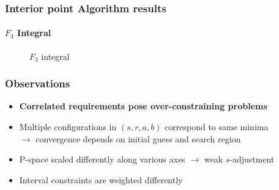 \documentclass[10pt]{beamer}
\newcommand{\rarrow}{$\rightarrow$ }
\newcommand{\rfn}{\setcounter{footnote}{0}}
\begin{document}
\begin{frame}
  \frametitle{Interior point Algorithm results}
  \rfn
  \framesubtitle{$F_3$ Integral}
  \begin{figure}
    \centering
    \label{some example}
    \caption{$F_3$ integral}
  \end{figure}
\end{frame}



\begin{frame}
  \rfn
  \frametitle{Observations}
  \begin{itemize}
    \item \textbf{Correlated requirements pose over-constraining problems}
    \vspace{0.5cm}
    \item Multiple configurations in $(s, r, a, b)$ correspond to same minima\\
      \rarrow convergence depends on initial guess and search region
    \vspace{0.5cm}
    \item P-space scaled differently along various axes \rarrow weak $s$-adjustment
    \vspace{0.5cm}
    \item Interval constraints are weighted differently
  \end{itemize}
\end{frame}
\end{document}
